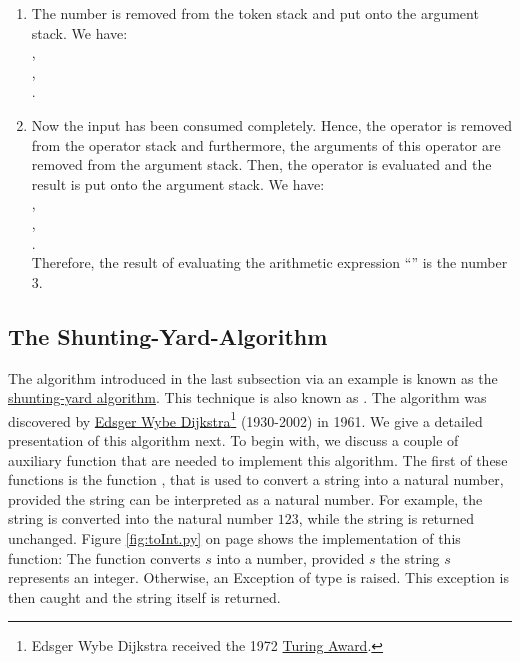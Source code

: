 \begin{enumerate}
\item The number  is removed from the token stack and put onto the argument stack. We have: \\[0.2cm]
      \hspace*{1.3cm} , \\[0.2cm]
      \hspace*{1.3cm} , \\[0.2cm]
      \hspace*{1.3cm} . 
\item Now the input has been consumed completely.
      Hence, the operator  is removed from the  operator stack and
      furthermore, the arguments of this operator are removed from the argument stack.  Then, the
      operator  is evaluated and the result is put onto the argument
      stack.  We have: \\[0.2cm]
      \hspace*{1.3cm} , \\[0.2cm]
      \hspace*{1.3cm} , \\[0.2cm]
      \hspace*{1.3cm} . \\[0.2cm]
      Therefore, the result of evaluating the arithmetic expression ``'' is the
      number 3.
\end{enumerate}

\subsection{The Shunting-Yard-Algorithm \label{algo-arith}}
The algorithm introduced in the last subsection via an example is known as the 
\href{http://en.wikipedia.org/wiki/Shunting-yard_algorithm}{shunting-yard algorithm}.  
This technique is also known as .
The algorithm was discovered by  \href{http://en.wikipedia.org/wiki/Edsger_Dijkstra}{Edsger Wybe Dijkstra}\footnote{
  Edsger Wybe Dijkstra received the 1972 \href{https://en.wikipedia.org/wiki/Turing_Award}{Turing Award}.
}
(1930-2002) in 1961. 
We give a detailed presentation of this algorithm next.  To begin with, we discuss a couple of auxiliary
function that are needed to implement this algorithm.  The first of these functions is the function
, that is used to convert a string into a natural number, provided the string can be interpreted as a
natural number.  For example, the string  is converted into the natural number $123$, while the
string  is returned unchanged.  Figure \ref{fig:toInt.py} on page \pageref{fig:toInt.py} shows the
implementation of this function:  The function  converts $s$ into a number, provided $s$ the string
$s$ represents an integer.  Otherwise, an Exception of type  is raised.  This exception is
then caught and the string itself is returned.


